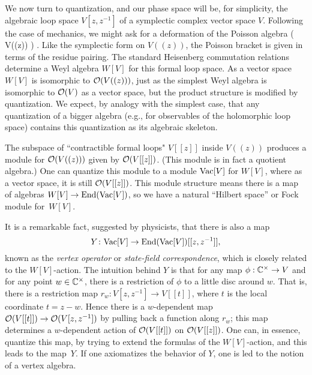 \documentclass[11pt]{amsart}
\begin{document}
We now turn to quantization, and our phase space will be, for simplicity, the algebraic loop space $V[z,z^{-1}]$ of a symplectic complex vector space $V$.
Following the case of mechanics, we might ask for a deformation of the Poisson algebra
\beqn
\cO\left( V((z)) \right) .
\eeqn
Like the symplectic form on $V((z))$, the Poisson bracket is given in terms of the residue pairing.
The standard Heisenberg commutation relations determine a Weyl algebra $W[V]$ for this formal loop space.
As a vector space $W[V]$ is isomorphic to $\mathcal O(V((z)))$, 
just as the simplest Weyl algebra is isomorphic to $\mathcal O(V)$ as a vector space,
but the product structure is modified by quantization.
We expect, by analogy with the simplest case, that any quantization of a bigger algebra (e.g., for observables of the holomorphic loop space) contains this quantization as its algebraic skeleton.

The subspace of ``contractible formal loops" $V[[z]]$ inside $V((z))$ produces a module for $\mathcal O(V((z)))$ given by $\mathcal O(V[[z]])$. 
(This module is in fact a quotient algebra.)
One can quantize this module to a module ${\rm Vac}[V]$ for $W[V]$,
where as a vector space, it is still $\mathcal O(V[[z]])$.
This module structure means there is a map of algebras $W[V] \to {\rm End}({\rm Vac}[V])$,
so we have a natural ``Hilbert space'' or Fock module for~$W[V]$.

It is a remarkable fact, suggested by physicists, that there is also a map
\[
Y \colon {\rm Vac}[V] \to {\rm End}({\rm Vac}[V])[[z, z^{-1}]],
\]
known as the {\em vertex operator} or {\em state-field correspondence},
which is closely related to the $W[V]$-action.
The intuition behind $Y$ is that for any map $\phi: \mathbb C^\times \to V$ and for any point $w \in \mathbb C^\times$, 
there is a restriction of $\phi$ to a little disc around $w$.
That is, there is a restriction map $r_w: V[z,z^{-1}] \to V[[t]]$, where $t$ is the local coordinate $t = z-w$.
Hence there is a $w$-dependent map $\mathcal O(V[[t]]) \to \mathcal O(V[z,z^{-1}])$ by pulling back a function along $r_w$;
this map determines a $w$-dependent action of $\mathcal O(V[[t]])$ on $\mathcal O(V[[z]])$.
One can, in essence, quantize this map, by trying to extend the formulas of the $W[V]$-action,
and this leads to the map~$Y$.
If one axiomatizes the behavior of $Y$, one is led to the notion of a vertex algebra.
\end{document}
